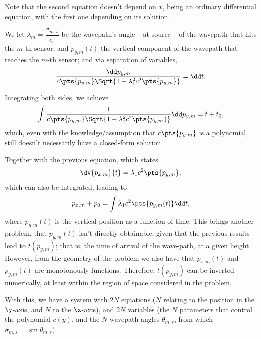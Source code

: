 
Note that the second equation doesn't depend on $x$, being an ordinary differential equation, with the first one depending on its solution.

We let $\lambda_m = \dfrac{\sigma_{m,s}}{c_s}$ be the wavepath's angle -- at source -- of the wavepath that hits the $m$-th sensor, and $p_{y,m}(t)$ the vertical component of the wavepath that reaches the $m$-th sensor; and via separation of variables,
\begin{equation}
	\frac{\dd p_{y,m}}{c\pts{p_{y,m}}\Sqrt{1-\lambda_1^2 c^2\pts{p_{y,m}}}} = \dd t.
\end{equation}

Integrating both sides, we achieve
\begin{equation}
	\int \frac{1}{c\pts{p_{y,m}}\Sqrt{1-\lambda_1^2 c^2\pts{p_{y,m}}}} \dd p_{y,m} = t + t_0,
\end{equation}
which, even with the knowledge/assumption that $c\pts{p_{y,m}}$ is a polynomial, still doesn't necessarily have a closed-form solution.

Together with the previous equation, which states
\begin{equation}
	\dv{p_{x,m}}{t} = \lambda_1 c^2\pts{p_{y,m}},
\end{equation}
which can also be integrated, leading to
\begin{equation}
	p_{x,m} + p_0 = \int \lambda_1 c^2\pts{p_{y,m}(t)} \dd t,
\end{equation}
where $p_{y,m}(t)$ is the vertical position as a function of time. This brings another problem, that $p_{y,m}(t)$ isn't directly obtainable, given that the previous results lead to $t(p_{y,m})$; that is, the time of arrival of the wave-path, at a given height. However, from the geometry of the problem we also have that $p_{x,m}(t)$ and $p_{y,m}(t)$ are monotonously functions. Therefore, $t(p_{y,m})$ can be inverted numerically, at least within the region of space considered in the problem.

With this, we have a system with $2N$ equations ($N$ relating to the position in the $\y$-axis, and $N$ to the $\x$-axis), and $2N$ variables (the $N$ parameters that control the polynomial $c(y)$, and the $N$ wavepath angles $\theta_{m,s}$, from which $\sigma_{m,s} = \sin \theta_{m,s}$).

